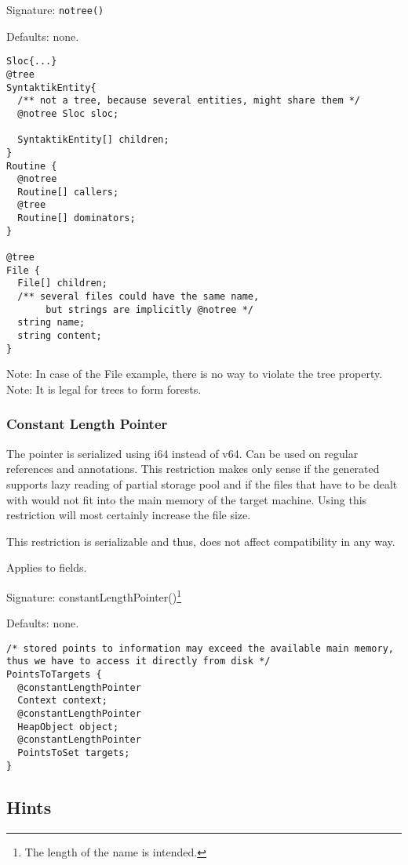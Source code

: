 Signature: \verb/notree()/

Defaults: none.

\begin{lstlisting}[label=treeExample,caption=Examples,language=skill]
Sloc{...}
@tree
SyntaktikEntity{
  /** not a tree, because several entities, might share them */
  @notree Sloc sloc;
  
  SyntaktikEntity[] children;
}
Routine {
  @notree
  Routine[] callers;
  @tree
  Routine[] dominators;
}

@tree
File {
  File[] children;
  /** several files could have the same name,
       but strings are implicitly @notree */
  string name;
  string content;
} 
\end{lstlisting}
Note: In case of the File example, there is no way to violate the tree property.
Note: It is legal for trees to form forests.


\subsubsection*{Constant Length Pointer}
The pointer is serialized using i64 instead of v64. Can be used on regular references and annotations. This restriction makes only sense if the generated supports lazy reading of partial storage pool and if the files that have to be dealt with would not fit into the main memory of the target machine. Using this restriction will most certainly increase the file size.

This restriction is serializable and thus, does not affect compatibility in any way.

Applies to fields.

Signature: constantLengthPointer()\footnote{The length of the name is intended.}

Defaults: none.

\begin{lstlisting}[label=treeExample,caption=Examples,language=skill]
/* stored points to information may exceed the available main memory, thus we have to access it directly from disk */
PointsToTargets {
  @constantLengthPointer
  Context context;
  @constantLengthPointer
  HeapObject object;
  @constantLengthPointer
  PointsToSet targets;
}
\end{lstlisting}

\subsection{Hints}
\label{hints}

